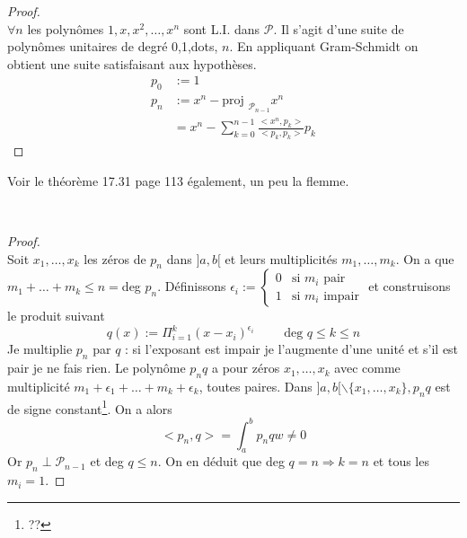 	
\begin{proof}\ \\
	$\forall n$ les polynômes $1,x,x^2,\dots,x^n$ sont L.I. dans $\mathcal{P}$. 
	Il s'agit d'une suite de polynômes unitaires de degré 0,1,dots, $n$. En 
	appliquant Gram-Schmidt on obtient une suite satisfaisant aux hypothèses.
	\begin{equation}
		\begin{array}{ll}
			p_0 & := 1                                                     \\
			p_n & := x^n - \text{proj }_{\mathcal{P}_{n-1}} x^n            \\
			    & = x^n - \sum_{k=0}^{n-1} \frac{<x^n, p_k>}{<p_k,p_k>}p_k 
		\end{array}
	\end{equation}
\end{proof}
Voir le théorème 17.31 page 113 également, un peu la flemme.
	
	
	
\theor{\ \\
	$\forall w|_{[a,b]}, p_n$ possède $n$ zéros distincts dans $]a,b[$.}\ 
	
\begin{proof}\ \\
	Soit $x_1, \dots, x_k$ les zéros de $p_n$ dans $]a,b[$ et leurs 
	multiplicités $m_1, \dots, m_k$. On a que $m_1 + \dots + m_k 
	\leq n = $deg $p_n$. Définissons $\epsilon_i := \left\{\begin{array}{ll}
	0 & \text{si $m_i$ pair}\\
	1 & \text{si $m_i$ impair}
	\end{array}\right.$ et construisons le produit suivant 
	\begin{equation}
		q(x) :=\Pi_{i=1}^k (x-x_i)^{\epsilon_i}\qquad \text{ deg } q \leq k \leq n
	\end{equation}
	Je multiplie $p_n$ par $q$ : si l'exposant est impair je l'augmente d'une 
	unité et s'il est pair je ne fais rien. Le polynôme $p_nq$ a pour zéros 
	$x_1, \dots, x_k$ avec comme multiplicité $m_1+\epsilon_1+\dots+m_k+
	\epsilon_k$, toutes paires. Dans $]a,b[\backslash\{x_1,\dots,x_k\}, p_nq$ 
	est de signe constant\footnote{??}. On a alors 
	\begin{equation}
		<p_n, q> = \int_a^b p_nqw \neq 0
	\end{equation}
	Or $p_n \perp \mathcal{P}_{n-1}$ et deg $q \leq n$. On en déduit que deg $q 
	= n \Longrightarrow k = n$ et tous les $m_i = 1$.
\end{proof}
	

